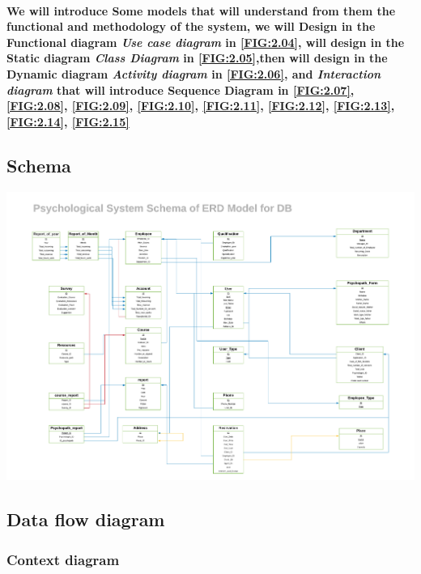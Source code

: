 \documentclass[../Psychological_system_web_application.tex]{subfiles}
\begin{document}
			\paragraph{We will introduce Some models that will understand from them the functional and methodology of the system, we will Design in the Functional diagram \textsl{Use case diagram} in \ref{FIG:2.04}, will design in the Static diagram \textsl{Class Diagram} in \ref{FIG:2.05},then will design in the Dynamic diagram \textsl{Activity diagram} in \ref{FIG:2.06}, and \textsl{Interaction diagram} that will introduce \textsf{Sequence Diagram} in \ref{FIG:2.07}, \ref{FIG:2.08}, \ref{FIG:2.09}, \ref{FIG:2.10}, \ref{FIG:2.11}, \ref{FIG:2.12}, \ref{FIG:2.13}, \ref{FIG:2.14}, \ref{FIG:2.15}}
			\subsection{Schema}
				
					\includegraphics[width=\textwidth ,height=0.9\textheight ,scale=4]{Diagrams/Psychological_schema.pdf}
					\label{FIG:2.01}
				
								
				
			\subsection{Data flow diagram}
				\subsubsection{Context diagram}
					
\end{document}
